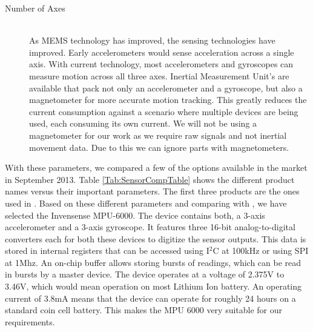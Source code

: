 \begin{description}
\item[Number of Axes] \hfill \\
As MEMS technology has improved, the sensing technologies have improved.
Early accelerometers would sense acceleration across a single axis.
With current technology, most accelerometers and gyroscopes can measure motion across all three axes.
Inertial Measurement Unit's are available that pack not only an accelerometer and a gyroscope,
but also a magnetometer for more accurate motion tracking.
This greatly reduces the current consumption against a scenario where multiple devices are being used, each consuming its own current.
We will not be using a magnetometer for our work as we require raw signals and not inertial movement data.
Due to this we can ignore parts with magnetometers.
\end{description}
With these parameters, we compared a few of the options available in the market in September 2013. Table \ref{Tab:SensorCompTable} shows the different product names versus their important parameters. The first three products are the ones used in \cite{drennan2010assessment}.
Based on these different parameters and comparing with \cite{drennan2010assessment}, we have selected the Invensense MPU-6000. The device contains both, a 3-axis accelerometer and a 3-axis gyroscope. It features three 16-bit analog-to-digital converters each for both these devices to digitize the sensor outputs. This data is stored in internal registers that can be accessed using I$^{2}$C at 100kHz or using SPI at 1Mhz. An on-chip buffer allows storing bursts of readings, which can be read in bursts by a master device. The device operates at a voltage of 2.375V to 3.46V, which would mean operation on most Lithium Ion battery. An operating current of 3.8mA means that the device can operate for roughly 24 hours on a standard coin cell battery. This makes the MPU 6000 very suitable for our requirements.

